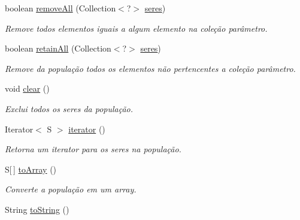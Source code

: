 \begin{DoxyCompactItemize}
boolean \hyperlink{classic_1_1populacional_1_1_populacao_3_01_g_01extends_01_number_01_6_comparable_3_01_g_01_4_00_506237fa66af7bbd01f529b68d4beaca_a9d611c9b711c8cd04b2324efd551990e}{remove\-All} (Collection$<$?$>$ \hyperlink{classic_1_1populacional_1_1_populacao_3_01_g_01extends_01_number_01_6_comparable_3_01_g_01_4_00_506237fa66af7bbd01f529b68d4beaca_a95b7dbe0db4e648740672366ee01877f}{seres})
\begin{DoxyCompactList}\small\item\em Remove todos elementos iguais a algum elemento na coleção parâmetro. \end{DoxyCompactList}\item 
boolean \hyperlink{classic_1_1populacional_1_1_populacao_3_01_g_01extends_01_number_01_6_comparable_3_01_g_01_4_00_506237fa66af7bbd01f529b68d4beaca_ad25c10c70bddd4de2b54080903346a9b}{retain\-All} (Collection$<$?$>$ \hyperlink{classic_1_1populacional_1_1_populacao_3_01_g_01extends_01_number_01_6_comparable_3_01_g_01_4_00_506237fa66af7bbd01f529b68d4beaca_a95b7dbe0db4e648740672366ee01877f}{seres})
\begin{DoxyCompactList}\small\item\em Remove da população todos os elementos não pertencentes a coleção parâmetro. \end{DoxyCompactList}\item 
void \hyperlink{classic_1_1populacional_1_1_populacao_3_01_g_01extends_01_number_01_6_comparable_3_01_g_01_4_00_506237fa66af7bbd01f529b68d4beaca_a13c723f86e08b836040c27250e9468ee}{clear} ()
\begin{DoxyCompactList}\small\item\em Exclui todos os seres da população. \end{DoxyCompactList}\item 
Iterator$<$ S $>$ \hyperlink{classic_1_1populacional_1_1_populacao_3_01_g_01extends_01_number_01_6_comparable_3_01_g_01_4_00_506237fa66af7bbd01f529b68d4beaca_af42ba15859ae243a0692a55c8eae6df6}{iterator} ()
\begin{DoxyCompactList}\small\item\em Retorna um iterator para os seres na população. \end{DoxyCompactList}\item 
S\mbox{[}$\,$\mbox{]} \hyperlink{classic_1_1populacional_1_1_populacao_3_01_g_01extends_01_number_01_6_comparable_3_01_g_01_4_00_506237fa66af7bbd01f529b68d4beaca_af1b34b37800fbc016dc9b6ac9027213b}{to\-Array} ()
\begin{DoxyCompactList}\small\item\em Converte a população em um array. \end{DoxyCompactList}\item 
String \hyperlink{classic_1_1populacional_1_1_populacao_3_01_g_01extends_01_number_01_6_comparable_3_01_g_01_4_00_506237fa66af7bbd01f529b68d4beaca_a85526563471237b8ec1303cf219eb2f5}{to\-String} ()
\end{DoxyCompactItemize}
